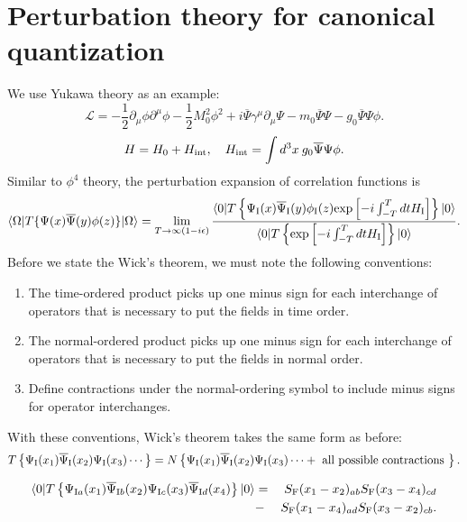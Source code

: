 \section{Perturbation theory for canonical quantization}
We use Yukawa theory as an example:
\[\mathcal{L} = -\frac{1}{2}\partial_{\mu} \phi \partial^{\mu} \phi -\frac{1}{2}M_0^2 \phi^2 + i\overline{\Psi} \gamma^{\mu} \partial_{\mu} \Psi - m_0\overline{\Psi}\Psi -g_0 \overline{\Psi}\Psi\phi.\]
\[H = H_0 + H_{\rm int} , \quad H_{\rm int} = \int d^3 x \: g_0 \overline{\Psi}\Psi\phi .\]
Similar to $\phi^4$ theory, the perturbation expansion of correlation functions is
\[\langle \Omega | T \{\Psi(x) \overline{\Psi}(y) \phi(z) \} | \Omega \rangle = \lim_{T \to \infty(1-i\epsilon)} \frac{\langle 0 | T \left\{ \Psi_{\rm I}(x) \overline{\Psi}_{\rm I}(y) \phi_{\rm I}(z) \mathrm{exp} \left[ -i \int_{-T}^{T} dt H_{\rm I} \right]\right\} | 0 \rangle}{\langle 0 | T \left\{ \mathrm{exp} \left[ -i \int_{-T}^{T} dt H_{\rm I} \right]\right\} | 0 \rangle}.\]
Before we state the Wick's theorem, we must note the following conventions:
\begin{enumerate}
\item  The time-ordered product picks up one minus sign for each interchange of operators that is necessary to put the fields in time order.
\item The normal-ordered product picks up one minus sign for each interchange of operators that is necessary to put the fields in normal order.
\item Define contractions under the normal-ordering symbol to include minus signs for operator interchanges.
\end{enumerate}
With these conventions, Wick's theorem takes the same form as before:
\[T \left\{ \Psi_{\rm I}(x_1) \overline{\Psi}_{\rm I}(x_2)  \Psi_{\rm I}(x_3) \cdots \right\} = N \left\{\Psi_{\rm I}(x_1) \overline{\Psi}_{\rm I}(x_2)  \Psi_{\rm I}(x_3) \cdots + \mbox{ all possible contractions }\right\} .\]
\begin{example}
\begin{eqnarray}
\langle 0 | T \left\{ \Psi_{{\rm I}a}(x_1) \overline{\Psi}_{{\rm I}b}(x_2) \Psi_{{\rm I}c}(x_3) \overline{\Psi}_{{\rm I}d}(x_4)\right\}| 0 \rangle &=& S_{\rm F}(x_1-x_2)_{ab}S_{\rm F}(x_3-x_4)_{cd} \nonumber \\
&-& S_{\rm F}(x_1-x_4)_{ad}S_{\rm F}(x_3-x_2)_{cb}. \nonumber
\end{eqnarray}
\end{example}

